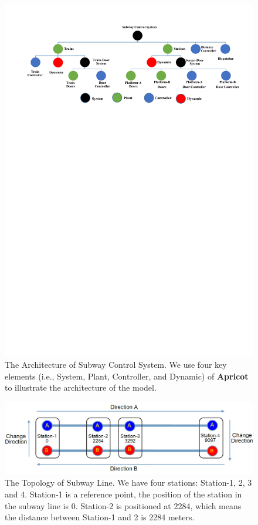 \documentclass{WileySix}
\newcommand{\apricot}{\bfseries Apricot}
\begin{document}
\begin{figure}
\centering
\includegraphics[width=1\linewidth]{./figs/systemstructure}
\caption[The Architecture of Subway Control System]{The Architecture of Subway Control System.
We use four key elements (i.e., System, Plant, Controller, and Dynamic) of {\apricot} to illustrate the architecture of the model.}
\label{fig:systemstructure}
\end{figure}

\begin{figure}
\centering
\includegraphics[width=0.8\linewidth]{./figs/sbwl}
\caption[The Topology of Subway Line]{The Topology of Subway Line. We have four stations: Station-1, 2, 3 and 4. Station-1 is a reference point, the position of the station in the subway line is 0. Station-2 is positioned at 2284, which means the distance between Station-1 and 2 is 2284 meters.}
\label{fig:sbwl}
\end{figure}
\end{document}
